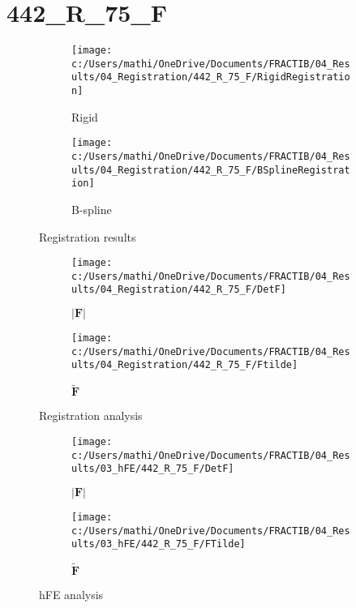 \documentclass{article}%
\begin{document}
%
\newpage%
\section*{442\_R\_75\_F}%
\label{sec:442R75F}%


\begin{figure}[h!]%
\begin{subfigure}[b]{0.5\linewidth}%
\texttt{[image: c:/Users/mathi/OneDrive/Documents/FRACTIB/04\_Results/04\_Registration/442\_R\_75\_F/RigidRegistration]}%
\caption{Rigid}%
\end{subfigure}%
\begin{subfigure}[b]{0.5\linewidth}%
\texttt{[image: c:/Users/mathi/OneDrive/Documents/FRACTIB/04\_Results/04\_Registration/442\_R\_75\_F/BSplineRegistration]}%
\caption{B{-}spline}%
\end{subfigure}%
\caption{Registration results}%
\end{figure}

%


\begin{figure}[h!]%
\begin{subfigure}[b]{0.5\linewidth}%
\texttt{[image: c:/Users/mathi/OneDrive/Documents/FRACTIB/04\_Results/04\_Registration/442\_R\_75\_F/DetF]}%
\caption{$|\mathbf{F}|$}%
\end{subfigure}%
\begin{subfigure}[b]{0.5\linewidth}%
\texttt{[image: c:/Users/mathi/OneDrive/Documents/FRACTIB/04\_Results/04\_Registration/442\_R\_75\_F/Ftilde]}%
\caption{$\tilde{\mathbf{F}}$}%
\end{subfigure}%
\caption{Registration analysis}%
\end{figure}

%


\begin{figure}[h!]%
\begin{subfigure}[b]{0.5\linewidth}%
\texttt{[image: c:/Users/mathi/OneDrive/Documents/FRACTIB/04\_Results/03\_hFE/442\_R\_75\_F/DetF]}%
\caption{$|\mathbf{F}|$}%
\end{subfigure}%
\begin{subfigure}[b]{0.5\linewidth}%
\texttt{[image: c:/Users/mathi/OneDrive/Documents/FRACTIB/04\_Results/03\_hFE/442\_R\_75\_F/FTilde]}%
\caption{$\tilde{\mathbf{F}}$}%
\end{subfigure}%
\caption{hFE analysis}%
\end{figure}
\end{document}
